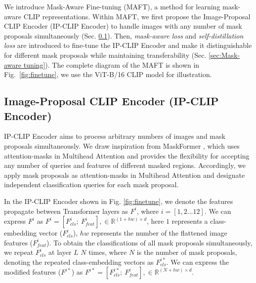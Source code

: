 


We introduce Mask-Aware Fine-tuning (MAFT), a method for learning mask-aware CLIP representations. 
Within MAFT, we first propose the Image-Proposal CLIP Encoder (IP-CLIP Encoder) to handle images with any number of mask proposals simultaneously (Sec. \ref{sec:IP-CLIP}). Then, \textit{mask-aware loss}  and \textit{self-distillation loss}  are introduced to fine-tune the IP-CLIP Encoder and make it distinguishable for different mask proposals while maintaining transferability (Sec. \ref{sec:Mask-aware tuning}).
The complete diagram of the MAFT is shown in Fig.~\ref{fig:finetune}, we use the ViT-B/16 CLIP model for illustration.


\subsection{Image-Proposal CLIP Encoder (IP-CLIP Encoder)}
\label{sec:IP-CLIP}
IP-CLIP Encoder aims to process arbitrary numbers of images and mask proposals simultaneously. We draw inspiration from MaskFormer \cite{cheng2021mask2former, cheng2021maskformer}, which uses attention-masks in Multihead Attention and provides the flexibility for accepting any number of queries and features of different masked regions. Accordingly, we apply mask proposals as attention-masks in Multihead Attention and designate independent classification queries for each mask proposal.
 
In the IP-CLIP Encoder shown in Fig. \ref{fig:finetune}, we denote the features propagate between Transformer layers as $F^i$, where $i = [1,2...12]$. We can express $F^i$ as $F^i = [F^i_{cls};~ F^i_{feat}], \in \mathbb{R}^{(1 + hw) \times d}$, here $1$ represents a class-embedding vector ($F^i_{cls}$), $hw$ represents the number of the flattened image features ($F^i_{feat}$). 
To obtain the classifications of all mask proposals simultaneously, we repeat $F^i_{cls}$ at layer $L$ $N$ times, where $N$ is the number of mask proposals, denoting the repeated class-embedding vectors as $F^{i*}_{cls}$. We can express the modified features ($F^{i*}$) as $F^{i*} = [F^{i*}_{cls};~ F^i_{feat}], \in \mathbb{R}^{(N + hw) \times d}$.

